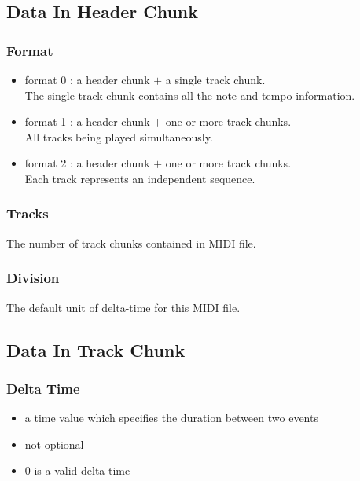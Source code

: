 \documentclass[12.5pt]{scrartcl}
\begin{document}
\subsection{Data In Header Chunk} 
\subsubsection{Format}
    \begin{itemize}
     \item format 0 : a header chunk $+$ a single track chunk.  \\
        \-\hspace{4.7em}The single track chunk contains all the note and tempo information.
     \item format 1 : a header chunk $+$ one or more track chunks.  \\
        \-\hspace{4.7em}All tracks being played simultaneously.
     \item format 2 : a header chunk $+$ one or more track chunks.  \\
        \-\hspace{4.7em}Each track represents an independent sequence.
    \end{itemize}
\subsubsection{Tracks}
The number of track chunks contained in MIDI file.

\subsubsection{Division}
The default unit of delta-time for this MIDI file.


\subsection{Data In Track Chunk}
\subsubsection{Delta Time}
    \begin{itemize}
        \item a time value which specifies the duration between two events
        \item not optional
        \item 0 is a valid delta time
    \end{itemize}
    
\end{document}
